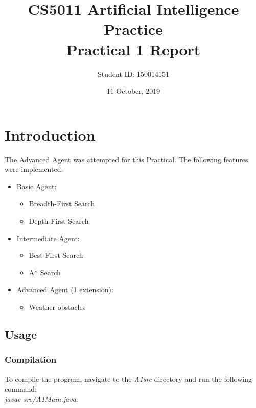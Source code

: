 \documentclass[letterpaper,12pt]{article}
\begin{document}
\title{CS5011 Artificial Intelligence Practice\\Practical 1 Report}
\author{Student ID: 150014151}
\date{11 October, 2019}
\maketitle
\newpage



\section{Introduction}
\label{sec:introduction}

The Advanced Agent was attempted for this Practical. The following features were implemented:
\begin{itemize}
    \item Basic Agent:
    \begin{itemize}
       \item Breadth-First Search
        \item Depth-First Search
    \end{itemize}
    \item Intermediate Agent:
    \begin{itemize}
        \item Best-First Search
        \item A* Search
    \end{itemize}
    \item Advanced Agent (1 extension):
    \begin{itemize}
        \item Weather obstacles
    \end{itemize}
\end{itemize}

\subsection{Usage}

\subsubsection{Compilation}

To compile the program, navigate to the \textit{A1src} directory and run the following command:\\

\textit{javac src/A1Main.java}.
\end{document}
